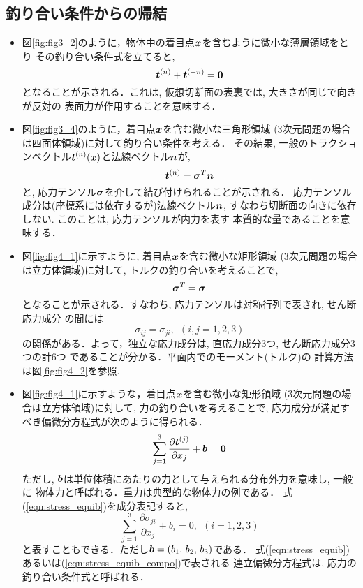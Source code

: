 \documentclass[10pt,a4j]{jbook}
\begin{document}
\subsection{釣り合い条件からの帰結}\label{equib}
\begin{itemize}
\item
	図\ref{fig:fig3_2}のように，物体中の着目点$\mbox{\boldmath $x$}$を含むように微小な薄層領域をとり
	その釣り合い条件式を立てると, 
	\begin{equation}
		\mbox{\boldmath $t$}^{(n)}+\mbox{\boldmath $t$}^{(-n)}=\mbox{\boldmath $0$}
		\label{eqn:t_pmn}
	\end{equation}
	となることが示される．これは, 仮想切断面の表裏では, 大きさが同じで向きが反対の
	表面力が作用することを意味する．
\item
	図\ref{fig:fig3_4}のように，着目点$\mbox{\boldmath $x$}$を含む微小な三角形領域
	(3次元問題の場合は四面体領域)に対して釣り合い条件を考える．
	その結果, 一般のトラクションベクトル$\mbox{\boldmath $t$}^{(n)}(\mbox{\boldmath $x$})$と法線ベクトル$\mbox{\boldmath $n$}$が, 
	\begin{equation}
		\mbox{\boldmath $t$}^{(n)}=\mbox{\boldmath $\sigma$}^{T}\mbox{\boldmath $n$}
		\label{eqn:t_as_sign}
	\end{equation}
	と, 応力テンソル$\mbox{\boldmath $\sigma$}$を介して結び付けられることが示される．
	応力テンソル成分は(座標系には依存するが)法線ベクトル$\mbox{\boldmath $n$}$, 
	すなわち切断面の向きに依存しない. このことは, 応力テンソルが内力を表す
	本質的な量であることを意味する．
\item
	図\ref{fig:fig4_1}に示すように, 着目点$\mbox{\boldmath $x$}$を含む微小な矩形領域
	(3次元問題の場合は立方体領域)に対して, トルクの釣り合いを考えることで, 
	\begin{equation}
		\mbox{\boldmath $\sigma$}^{T}=\mbox{\boldmath $\sigma$}
		\label{eqn:sig_sym}
	\end{equation}
	となることが示される．すなわち, 応力テンソルは対称行列で表され, せん断応力成分
	の間には
	\begin{equation}
		\sigma_{ij}=\sigma_{ji}, \ \ (i,j=1,2,3)
		\label{eqn:sig_sym_comp}
	\end{equation}
	の関係がある．よって，独立な応力成分は, 直応力成分3つ, せん断応力成分3つの計6つ
	であることが分かる．平面内でのモーメント(トルク)の
	計算方法は図\ref{fig:fig4_2}を参照.
\item
	図\ref{fig:fig4_1}に示すような，着目点$\mbox{\boldmath $x$}$を含む微小な矩形領域
	(3次元問題の場合は立方体領域)に対して, 力の釣り合いを考えることで, 
	応力成分が満足すべき偏微分方程式が次のように得られる．
	\begin{equation}
		\sum_{j=1}^3 \frac{\partial \mbox{\boldmath $t$}^{(j)}}{\partial x_j}+\mbox{\boldmath $b$}=\mbox{\boldmath $0$}
		\label{eqn:stress_equib}
	\end{equation}
	ただし, $\mbox{\boldmath $b$}$は単位体積にあたりの力として与えられる分布外力を意味し, 一般に
	物体力と呼ばれる．重力は典型的な物体力の例である．
	式(\ref{eqn:stress_equib})を成分表記すると, 
	\begin{equation}
		\sum_{j=1}^3 \frac{\partial \sigma_{ji}}{\partial x_j}+b_i=0, \ \ (i=1,2,3)
		\label{eqn:stress_equib_compo}
	\end{equation}
	と表すこともできる．ただし$\mbox{\boldmath $b$}=(b_1,\,b_2,\, b_3)$である．
	式(\ref{eqn:stress_equib})あるいは(\ref{eqn:stress_equib_compo})で表される
	連立偏微分方程式は, 応力の釣り合い条件式と呼ばれる．
\end{itemize}
\end{document}
